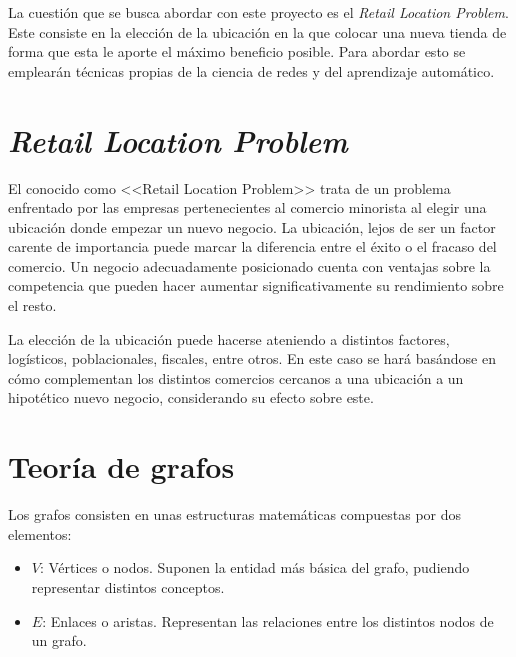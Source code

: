 
La cuestión que se busca abordar con este proyecto es el \textit{Retail Location Problem}. Este consiste
en la elección de la ubicación en la que colocar una nueva tienda de forma que esta le aporte el máximo beneficio posible. Para abordar esto se emplearán técnicas propias de la ciencia de redes y del aprendizaje automático.

\section{\textit{Retail Location Problem}}

El conocido como <<Retail Location Problem>> trata de un problema enfrentado por las empresas pertenecientes al comercio minorista al elegir una ubicación donde empezar un nuevo negocio. La ubicación, lejos de ser un factor carente de importancia puede marcar la diferencia entre el éxito o el fracaso del comercio. Un negocio adecuadamente posicionado cuenta con ventajas sobre la competencia que pueden hacer aumentar significativamente su rendimiento sobre el resto.

La elección de la ubicación puede hacerse ateniendo a distintos factores, logísticos, poblacionales, fiscales, entre otros. En este caso se hará basándose en cómo complementan los distintos comercios cercanos a una ubicación a un hipotético nuevo negocio, considerando su efecto sobre este. 

%


\section{Teoría de grafos}

Los grafos consisten en unas estructuras matemáticas compuestas por dos elementos:

\begin{itemize}
	\item $V$: Vértices o nodos. Suponen la entidad más básica del grafo, pudiendo representar distintos conceptos.
	\item $E$: Enlaces o aristas. Representan las relaciones entre los distintos nodos de un grafo.
\end{itemize}

